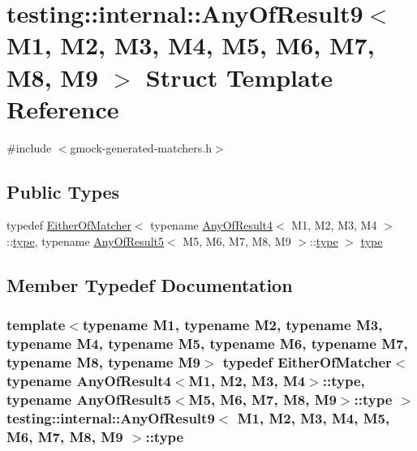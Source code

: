 \hypertarget{structtesting_1_1internal_1_1_any_of_result9}{}\section{testing\+:\+:internal\+:\+:Any\+Of\+Result9$<$ M1, M2, M3, M4, M5, M6, M7, M8, M9 $>$ Struct Template Reference}
\label{structtesting_1_1internal_1_1_any_of_result9}


{\ttfamily \#include $<$gmock-\/generated-\/matchers.\+h$>$}

\subsection*{Public Types}
\begin{DoxyCompactItemize}
\item 
typedef \hyperlink{classtesting_1_1internal_1_1_either_of_matcher}{Either\+Of\+Matcher}$<$ typename \hyperlink{structtesting_1_1internal_1_1_any_of_result4}{Any\+Of\+Result4}$<$ M1, M2, M3, M4 $>$\+::\hyperlink{structtesting_1_1internal_1_1_any_of_result9_a308935fb02c62f502044dcc7b0a2b464}{type}, typename \hyperlink{structtesting_1_1internal_1_1_any_of_result5}{Any\+Of\+Result5}$<$ M5, M6, M7, M8, M9 $>$\+::\hyperlink{structtesting_1_1internal_1_1_any_of_result9_a308935fb02c62f502044dcc7b0a2b464}{type} $>$ \hyperlink{structtesting_1_1internal_1_1_any_of_result9_a308935fb02c62f502044dcc7b0a2b464}{type}
\end{DoxyCompactItemize}


\subsection{Member Typedef Documentation}
\subsubsection[{\texorpdfstring{type}{type}}]{\setlength{\rightskip}{0pt plus 5cm}template$<$typename M1, typename M2, typename M3, typename M4, typename M5, typename M6, typename M7, typename M8, typename M9$>$ typedef {\bf Either\+Of\+Matcher}$<$ typename {\bf Any\+Of\+Result4}$<$M1, M2, M3, M4$>$\+::{\bf type}, typename {\bf Any\+Of\+Result5}$<$M5, M6, M7, M8, M9$>$\+::{\bf type} $>$ {\bf testing\+::internal\+::\+Any\+Of\+Result9}$<$ M1, M2, M3, M4, M5, M6, M7, M8, M9 $>$\+::{\bf type}}\hypertarget{structtesting_1_1internal_1_1_any_of_result9_a308935fb02c62f502044dcc7b0a2b464}{}\label{structtesting_1_1internal_1_1_any_of_result9_a308935fb02c62f502044dcc7b0a2b464}



